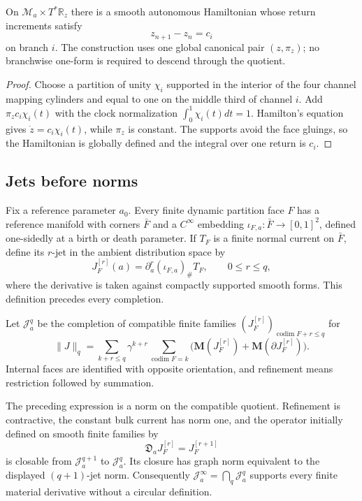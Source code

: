 \begin{proposition}
\label{prop:r16-a1-work}
On \(\mathcal M_a\times T^*\mathbb R_z\) there is a smooth autonomous
Hamiltonian whose return increments satisfy
\[
 z_{n+1}-z_n=c_i
\]
on branch \(i\).  The construction uses one global canonical pair
\((z,\pi_z)\); no branchwise one-form is required to descend through the
quotient.
\end{proposition}

\begin{proof}
Choose a partition of unity \(\chi_i\) supported in the interior of the four
channel mapping cylinders and equal to one on the middle third of channel
\(i\).  Add \(\pi_zc_i\chi_i(t)\) with the clock normalization
\(\int_0^1\chi_i(t)dt=1\).  Hamilton's equation gives
\(\dot z=c_i\chi_i(t)\), while \(\pi_z\) is constant.  The supports avoid the
face gluings, so the Hamiltonian is globally defined and the integral over one
return is \(c_i\).
\end{proof}

\subsection{Jets before norms}

Fix a reference parameter \(a_0\).  Every finite dynamic partition face
\(F\) has a reference manifold with corners \(\bar F\) and a \(C^\infty\)
embedding \(\iota_{F,a}:\bar F\to[0,1]^2\), defined one-sidedly at a birth or
death parameter.  If \(T_F\) is a finite normal current on \(\bar F\), define
its \(r\)-jet in the ambient distribution space by
\[
 J_{F}^{[r]}(a)
 =\partial_a^r(\iota_{F,a})_\#T_F,
 \qquad 0\le r\le q,
\]
where the derivative is taken against compactly supported smooth forms.  This
definition precedes every completion.

Let \(\mathscr J_a^q\) be the completion of compatible finite families
\((J_F^{[r]})_{\operatorname{codim}F+r\le q}\) for
\[
 \|J\|_{q}
 =\sum_{k+r\le q}\gamma^{k+r}
   \sum_{\operatorname{codim}F=k}
   \bigl(\mathbf M(J_F^{[r]})+
         \mathbf M(\partial J_F^{[r]})\bigr).
\]
Internal faces are identified with opposite orientation, and refinement means
restriction followed by summation.

\begin{theorem}
\label{thm:r16-a1-jets}
The preceding expression is a norm on the compatible quotient.  Refinement is
contractive, the constant bulk current has norm one, and the operator initially
defined on smooth finite families by
\[
 \mathfrak D_aJ_F^{[r]}=J_F^{[r+1]}
\]
is closable from \(\mathscr J_a^{q+1}\) to \(\mathscr J_a^q\).  Its closure
has graph norm equivalent to the displayed \((q+1)\)-jet norm.  Consequently
\(\mathscr J_a^\infty=\bigcap_q\mathscr J_a^q\) supports every finite
material derivative without a circular definition.
\end{theorem}

